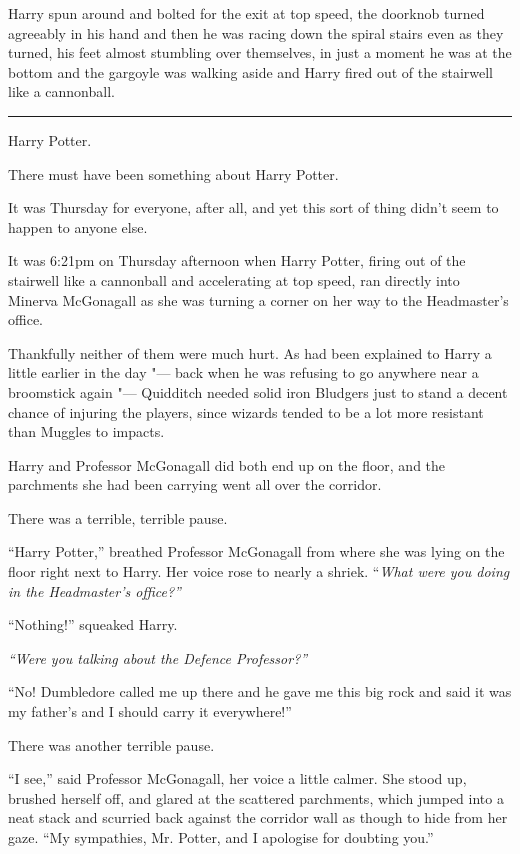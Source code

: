Harry spun around and bolted for the exit at top speed, the doorknob
turned agreeably in his hand and then he was racing down the spiral
stairs even as they turned, his feet almost stumbling over themselves,
in just a moment he was at the bottom and the gargoyle was walking aside
and Harry fired out of the stairwell like a cannonball.

\begin{center}\rule{3in}{0.4pt}\end{center}

Harry Potter.

There must have been something about Harry Potter.

It was Thursday for everyone, after all, and yet this sort of thing
didn't seem to happen to anyone else.

It was 6:21pm on Thursday afternoon when Harry Potter, firing out of the
stairwell like a cannonball and accelerating at top speed, ran directly
into Minerva McGonagall as she was turning a corner on her way to the
Headmaster's office.

Thankfully neither of them were much hurt. As had been explained to
Harry a little earlier in the day "--- back when he was refusing to go
anywhere near a broomstick again "--- Quidditch needed solid iron Bludgers
just to stand a decent chance of injuring the players, since wizards
tended to be a lot more resistant than Muggles to impacts.

Harry and Professor McGonagall did both end up on the floor, and the
parchments she had been carrying went all over the corridor.

There was a terrible, terrible pause.

``Harry Potter,'' breathed Professor McGonagall from where she was lying
on the floor right next to Harry. Her voice rose to nearly a shriek.
``\emph{What were you doing in the Headmaster's office?''}

``Nothing!'' squeaked Harry.

\emph{``Were you talking about the Defence Professor?''}

``No! Dumbledore called me up there and he gave me this big rock and
said it was my father's and I should carry it everywhere!''

There was another terrible pause.

``I see,'' said Professor McGonagall, her voice a little calmer. She
stood up, brushed herself off, and glared at the scattered parchments,
which jumped into a neat stack and scurried back against the corridor
wall as though to hide from her gaze. ``My sympathies, Mr. Potter, and I
apologise for doubting you.''

